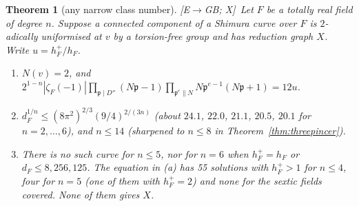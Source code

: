 \documentclass[11pt]{amsart}
\numberwithin{equation}{section}
\theoremstyle{plain}
\newtheorem{theorem}{Theorem}[section]
\theoremstyle{definition}\newtheorem{definition}[theorem]{Definition}
\theoremstyle{remark}\newtheorem{remark}[theorem]{Remark}
\newcommand{\ctag}[1]{\textup{\textsf{\scriptsize[#1]}}}
\begin{document}
\begin{theorem}[any narrow class number]\label{thm:anyh}
\ctag{E$\to$GB; X}\ Let $F$ be a totally real field of degree $n$. Suppose a connected component of a Shimura curve over $F$ is $2$-adically uniformised at $v$ by a torsion-free group and has reduction graph $X$. Write $u=h_F^+/h_F$.
\begin{enumerate}[label=(\alph*),nosep]
\item $N(v)=2$, and $2^{1-n}|\zeta_F(-1)|\prod_{\mathfrak p\mid D''}(N\mathfrak p-1)\prod_{\mathfrak p^e\parallel N}N\mathfrak p^{e-1}(N\mathfrak p+1)=12u$.
\item $d_F^{1/n}\le(8\pi^2)^{2/3}(9/4)^{2/(3n)}$ (about $24.1$, $22.0$, $21.1$, $20.5$, $20.1$ for $n=2,\dots,6$), and $n\le14$ (sharpened to $n\le8$ in Theorem~\ref{thm:threepincer}).
\item There is no such curve for $n\le5$, nor for $n=6$ when $h_F^+=h_F$ or $d_F\le8{,}256{,}125$. The equation in (a) has 55 solutions with $h_F^+>1$ for $n\le4$, four for $n=5$ (one of them with $h_F^+=2$) and none for the sextic fields covered. None of them gives $X$.
\end{enumerate}
\end{theorem}
\end{document}
